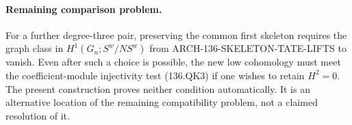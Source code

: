 \paragraph{Remaining comparison problem.}
For a further degree-three pair, preserving the common first
skeleton requires the graph class in
\(H^1(G_n;S^w/N S^w)\) from
ARCH-136-SKELETON-TATE-LIFTS to vanish. Even after such a
choice is possible, the new low cohomology must meet the
coefficient-module injectivity test (136.QK3) if one wishes
to retain \(H^2=0\). The present construction proves neither
condition automatically. It is an alternative location of the
remaining compatibility problem, not a claimed resolution of it.
